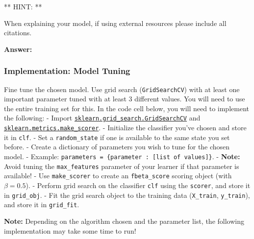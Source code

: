 \documentclass[11pt]{article}
\begin{document}
** HINT: **

When explaining your model, if using external resources please include
all citations.

    \textbf{Answer: }

    \subsubsection{Implementation: Model
Tuning}\label{implementation-model-tuning}

Fine tune the chosen model. Use grid search (\texttt{GridSearchCV}) with
at least one important parameter tuned with at least 3 different values.
You will need to use the entire training set for this. In the code cell
below, you will need to implement the following: - Import
\href{http://scikit-learn.org/0.17/modules/generated/sklearn.grid_search.GridSearchCV.html}{\texttt{sklearn.grid\_search.GridSearchCV}}
and
\href{http://scikit-learn.org/stable/modules/generated/sklearn.metrics.make_scorer.html}{\texttt{sklearn.metrics.make\_scorer}}.
- Initialize the classifier you've chosen and store it in \texttt{clf}.
- Set a \texttt{random\_state} if one is available to the same state you
set before. - Create a dictionary of parameters you wish to tune for the
chosen model. - Example:
\texttt{parameters\ =\ \{\textquotesingle{}parameter\textquotesingle{}\ :\ {[}list\ of\ values{]}\}}.
- \textbf{Note:} Avoid tuning the \texttt{max\_features} parameter of
your learner if that parameter is available! - Use \texttt{make\_scorer}
to create an \texttt{fbeta\_score} scoring object (with
\(\beta = 0.5\)). - Perform grid search on the classifier \texttt{clf}
using the \texttt{\textquotesingle{}scorer\textquotesingle{}}, and store
it in \texttt{grid\_obj}. - Fit the grid search object to the training
data (\texttt{X\_train}, \texttt{y\_train}), and store it in
\texttt{grid\_fit}.

\textbf{Note:} Depending on the algorithm chosen and the parameter list,
the following implementation may take some time to run!
\end{document}
